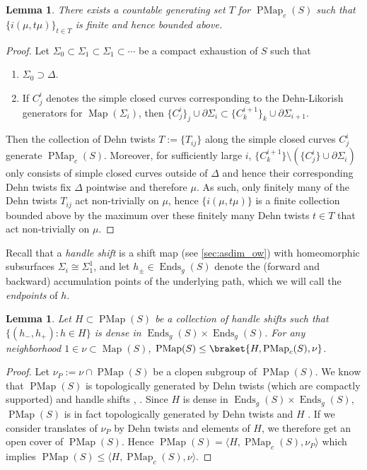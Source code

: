 \documentclass[twoside]{amsart}
\theoremstyle{plain}
\newtheorem{lemma}[theorem]{Lemma}
\theoremstyle{break}
\theoremstyle{definition}
\theoremstyle{remark}
\DeclareMathOperator{\Map}{Map}
\DeclareMathOperator{\Ends}{Ends}
\DeclareMathOperator{\PMap}{PMap}
\begin{document}
\begin{lemma}
    There exists a countable generating set $T$ for $\PMap_c(S)$ 
    such that $\{i(\mu,t\mu)\}_{t\in T}$ is 
    finite and hence bounded above.
\end{lemma}

\begin{proof}
    Let $\Sigma_0\subset\Sigma_1\subset\Sigma_1\subset\cdots$ be a compact exhaustion of $S$ such that 
    \begin{enumerate}
        \item $\Sigma_0\supset\Delta$.
        \item If $C_j^i$ denotes the simple closed curves corresponding to the Dehn-Likorish generators for $\Map(\Sigma_i)$, then $\{C_j^i\}_j\cup\partial\Sigma_i\subset \{C^{i+1}_k\}_k\cup\partial\Sigma_{i+1}$.
    \end{enumerate}
    Then the collection of Dehn twists 
    $T:=\{T_{ij}\}$ along the simple 
    closed curves $C_j^i$ generate 
    $\PMap_c(S)$. Moreover, for 
    sufficiently large 
    $i$, $\{C_k^{i+1}\}\setminus\left(\{C_j^i\}\cup\partial\Sigma_i\right)$ 
    only consists of simple closed 
    curves outside of $\Delta$ and hence their corresponding Dehn twists fix 
    $\Delta$ pointwise and 
    therefore $\mu$. As such, only finitely many of 
    the Dehn twists $T_{ij}$ act 
    non-trivially on $\mu$, 
    hence $\{i(\mu,t\mu)\}$ is a finite collection bounded 
    above by the maximum over these finitely many Dehn twists 
    $t\in T$ that act non-trivially on $\mu$.
\end{proof}

Recall that a \textit{handle shift} is a shift map (see
\cref{sec:asdim_ow}) with homeomorphic
subsurfaces $\Sigma_i \cong \Sigma_{1}^1$, and let $h_\pm \in
\Ends_g(S)$ denote the (forward and backward) 
accumulation points of the underlying path, which we will call the
\textit{endpoints} of $h$.  

\begin{lemma}\label{lem:pmap_gen}
  Let $H \subset \PMap(S)$ be a collection of handle shifts 
  such that $\{(h_-,h_+) : h \in H\}$ is dense in
  $\Ends_g(S)\times \Ends_g(S)$.  For any neighborhood
  $1 \in \nu \subset \Map(S)$, $\PMap(S) \leq
  \braket{H,\PMap_c(S),\nu}$.
\end{lemma}

\begin{proof}
    Let $\nu_P:=\nu\cap\PMap(S)$ be a clopen subgroup of $\PMap(S)$.      
    We know that 
    $\PMap(S)$ is topologically 
    generated by Dehn twists (which are compactly supported)
    and handle shifts {\cite[Thm.~4]{pv}}, {\cite[Cor.~6 and Section 
    2.3]{apv}}. Since $H$ is dense in 
    $\Ends_g(S)\times \Ends_g(S)$, $\PMap(S)$ is in fact topologically 
    generated by Dehn twists and $H$ 
    {\cite[Thm.~4.4]{avbig}}. If we consider translates of $\nu_P$ by 
    Dehn twists and elements of $H$, we therefore  get an open cover of 
    $\PMap(S)$. Hence $\PMap(S)=\langle H,\PMap_c(S),\nu_P\rangle$ which 
    implies $\PMap(S)\leq\langle H,\PMap_c(S),\nu\rangle$.
\end{proof}
\end{document}
